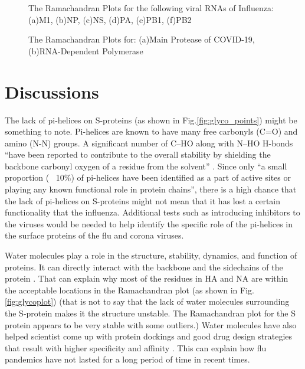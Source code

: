 \documentclass[conference]{IEEEtran}
\begin{document}
\begin{figure}
    \centering
    \caption{The Ramachandran Plots for the following viral RNAs of Influenza: (a)M1, (b)NP, (c)NS, (d)PA, (e)PB1, (f)PB2 }
    \label{fig:flu_rna_plot}
\end{figure}

\begin{figure}
    \centering
    \caption{The Ramachandran Plots for: (a)Main Protease of COVID-19, (b)RNA-Dependent Polymerase }
    \label{fig:covid_rna_plot}
\end{figure}



\section{Discussions}

The lack of pi-helices on S-proteins (as shown in Fig.\ref{fig:glyco_points}) might be something to note. Pi-helices are known to have many free carbonyls (C=O) and amino (N-N) groups. A significant number of C–HO along with N–HO H-bonds “have been reported to contribute to the overall stability by shielding the backbone carbonyl oxygen of a residue from the solvent” \citep{Kumar}. Since only “a small proportion (~ 10\%) of pi-helices have been identified as a part of active sites or playing any known functional role in protein chains”, there is a high chance that the lack of pi-helices on S-proteins might not mean that it has lost a certain functionality that the influenza. \citep{Kumar} Additional tests such as introducing inhibitors to the viruses would be needed to help identify the specific role of the pi-helices in the surface proteins of the flu and corona viruses. 

Water molecules play a role in the structure, stability, dynamics, and function of proteins. It can directly interact with the backbone and the sidechains of the protein \citep{Levy}. That can explain why most of the residues in HA and NA are within the acceptable locations in the Ramachandran plot (as shown in Fig.\ref{fig:glycoplot}) (that is not to say that the lack of water molecules surrounding the S-protein makes it the structure unstable. The Ramachandran plot for the S protein  appears to be very stable with some outliers.) Water molecules have also helped scientist come up with protein dockings and good drug design strategies that result with higher specificity and affinity \citep{Levy}. This can explain how flu pandemics have not lasted for a long period of time in recent times. 
\end{document}
